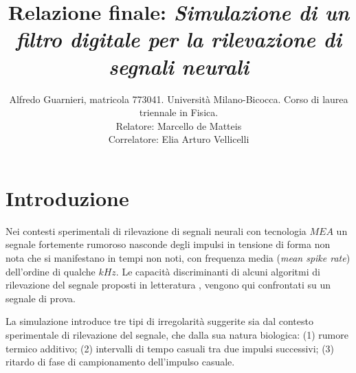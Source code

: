 \documentclass[9pt,twocolumn,twoside]{osajnl}
\title{
Relazione finale: \emph{ Simulazione di un filtro digitale per la rilevazione di segnali neurali}}
\author[1]{Alfredo Guarnieri, matricola 773041. Università Milano-Bicocca. Corso di laurea triennale in Fisica. \\
Relatore: Marcello de Matteis\\
Correlatore: Elia Arturo Vellicelli}
\begin{document}
\maketitle



\section{Introduzione}

Nei contesti sperimentali di rilevazione di segnali neurali con tecnologia $MEA$ un segnale fortemente rumoroso nasconde degli impulsi in tensione di forma non nota che si manifestano in tempi non noti, con frequenza media
({\it mean spike rate}) dell'ordine di qualche $kHz$. Le capacità discriminanti di alcuni algoritmi di rilevazione del segnale proposti in letteratura
\cite{Vallicelli2017}, \cite{Lambacher2011} vengono qui confrontati su un segnale di prova.

La simulazione introduce tre tipi di irregolarità suggerite sia dal contesto sperimentale di rilevazione del segnale, che dalla sua natura biologica: (1) rumore termico additivo; (2) intervalli di tempo casuali tra due impulsi successivi; (3) ritardo di fase di campionamento dell'impulso casuale.
\end{document}
